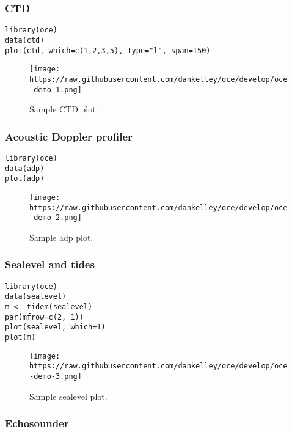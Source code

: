\documentclass[
]{article}
\begin{document}
\hypertarget{ctd}{%
\subsubsection{CTD}\label{ctd}}

\begin{verbatim}
library(oce)
data(ctd)
plot(ctd, which=c(1,2,3,5), type="l", span=150)
\end{verbatim}

\begin{figure}
\centering
\texttt{[image: https://raw.githubusercontent.com/dankelley/oce/develop/oce-demo-1.png]}
\caption{Sample CTD plot.}
\end{figure}

\hypertarget{acoustic-doppler-profiler}{%
\subsubsection{Acoustic Doppler
profiler}\label{acoustic-doppler-profiler}}

\begin{verbatim}
library(oce)
data(adp)
plot(adp)
\end{verbatim}

\begin{figure}
\centering
\texttt{[image: https://raw.githubusercontent.com/dankelley/oce/develop/oce-demo-2.png]}
\caption{Sample adp plot.}
\end{figure}

\hypertarget{sealevel-and-tides}{%
\subsubsection{Sealevel and tides}\label{sealevel-and-tides}}

\begin{verbatim}
library(oce)
data(sealevel)
m <- tidem(sealevel)
par(mfrow=c(2, 1))
plot(sealevel, which=1)
plot(m)
\end{verbatim}

\begin{figure}
\centering
\texttt{[image: https://raw.githubusercontent.com/dankelley/oce/develop/oce-demo-3.png]}
\caption{Sample sealevel plot.}
\end{figure}

\hypertarget{echosounder}{%
\subsubsection{Echosounder}\label{echosounder}}
\end{document}
